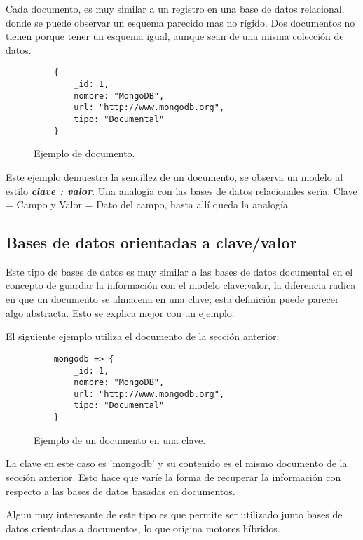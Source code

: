 Cada documento, es muy similar a un registro en una base de datos relacional, donde se puede observar un esquema parecido mas no r\'igido. Dos documentos no tienen porque tener un esquema igual, aunque sean de una misma colecci\'on de datos.

\begin{figure}[!ht]
    \centering
    \begin{lstlisting}
    {
	    _id: 1,
	    nombre: "MongoDB",
	    url: "http://www.mongodb.org",
	    tipo: "Documental"
    }
    \end{lstlisting}
    \caption[Bases de datos documental]{Ejemplo de documento.}
\end{figure}

Este ejemplo demuestra la sencillez de un documento, se observa un modelo al estilo \textit{\textbf{clave : valor}}. Una analog\'ia con las bases de datos relacionales ser\'ia: Clave = Campo y Valor = Dato del campo, hasta all\'i queda la analog\'ia.

\subsection{Bases de datos orientadas a clave/valor}

Este tipo de bases de datos es muy similar a las bases de datos documental en el concepto de guardar la informaci\'on con el modelo clave:valor, la diferencia radica en que un documento se almacena en una clave; esta definici\'on puede parecer algo abstracta. Esto se explica mejor con un ejemplo.

El siguiente ejemplo utiliza el documento de la secci\'on anterior:

\begin{figure}[!ht]
    \centering
    \begin{lstlisting}
    mongodb => {
	    _id: 1,
	    nombre: "MongoDB",
	    url: "http://www.mongodb.org",
	    tipo: "Documental"
    }
    \end{lstlisting}
    \caption[Bases de datos clave/valor]{Ejemplo de un documento en una clave.}
\end{figure}

La clave en este caso es 'mongodb' y su contenido es el mismo documento de la secci\'on anterior. Esto hace que var\'ie la forma de recuperar la informaci\'on con respecto a las bases de datos basadas en documentos.

Algun muy interesante de este tipo es que permite ser utilizado junto bases de datos orientadas a documentos, lo que origina motores h\'ibridos.

